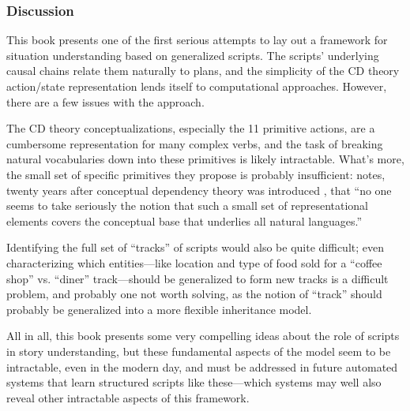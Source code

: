\subsubsection{Discussion}
This book presents one of the first serious attempts to lay out a framework for situation understanding based on generalized scripts. The scripts' underlying causal chains relate them naturally to plans, and the simplicity of the CD theory action/state representation lends itself to computational approaches. However, there are a few issues with the approach.

The CD theory conceptualizations, especially the 11 primitive actions, are a cumbersome representation for many complex verbs, and the task of breaking natural vocabularies down into these primitives is likely intractable. What's more, the small set of specific primitives they propose is probably insufficient: \citet{lytinen1992conceptual} notes, twenty years after conceptual dependency theory was introduced \citep{schank1969conceptual}, that ``no one seems to take seriously the notion that such a small set of representational elements covers the conceptual base that underlies all natural languages.''

Identifying the full set of ``tracks'' of scripts would also be quite difficult; even characterizing which entities---like location and type of food sold for a ``coffee shop'' vs. ``diner'' track---should be generalized to form new tracks is a difficult problem, and probably one not worth solving, as the notion of ``track'' should probably be generalized into a more flexible inheritance model.

All in all, this book presents some very compelling ideas about the role of scripts in story understanding, but these fundamental aspects of the model seem to be intractable, even in the modern day, and must be addressed in future automated systems that learn structured scripts like these---which systems may well also reveal other intractable aspects of this framework.





